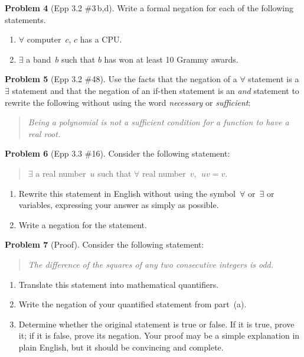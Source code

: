 \documentclass[11pt]{article}
\begin{document}
\noindent\textbf{Problem 4} (Epp 3.2 \#3\,b,d). \;
Write a formal negation for each of the following statements.

\begin{enumerate}[label=\textbf{\alph*.},start=2,itemsep=4pt]
  \item $\forall$ computer~$c$, $c$ has a CPU.
  \setcounter{enumi}{3}
  \item $\exists$ a band~$b$ such that $b$ has won at least 10
        Grammy awards.
\end{enumerate}

\bigskip

\noindent\textbf{Problem 5} (Epp 3.2 \#48). \;
Use the facts that the negation of a $\forall$ statement is a
$\exists$ statement and that the negation of an if-then
statement is an \emph{and} statement to rewrite the following
without using the word \emph{necessary} or \emph{sufficient}:

\begin{quote}
  \emph{Being a polynomial is not a sufficient condition for a
  function to have a real root.}
\end{quote}

\bigskip

\noindent\textbf{Problem 6} (Epp 3.3 \#16). \;
Consider the following statement:

\begin{quote}
  $\exists$ a real number~$u$ such that $\forall$ real number~$v$,
  $\;uv = v$.
\end{quote}

\begin{enumerate}[label=\textbf{(\alph*)},itemsep=4pt]
  \item Rewrite this statement in English without using the
        symbol~$\forall$ or~$\exists$ or variables, expressing
        your answer as simply as possible.
  \item Write a negation for the statement.
\end{enumerate}

\bigskip

\noindent\textbf{Problem 7} (Proof). \;
Consider the following statement:

\begin{quote}
  \emph{The difference of the squares of any two consecutive
  integers is odd.}
\end{quote}

\begin{enumerate}[label=\textbf{(\alph*)},itemsep=4pt]
  \item Translate this statement into mathematical
        quantifiers.
  \item Write the negation of your quantified statement from
        part~(a).
  \item Determine whether the original statement is true or
        false.  If it is true, prove it; if it is false, prove its
        negation.  Your proof may be a simple explanation in
        plain English, but it should be convincing and complete.
\end{enumerate}
\end{document}
